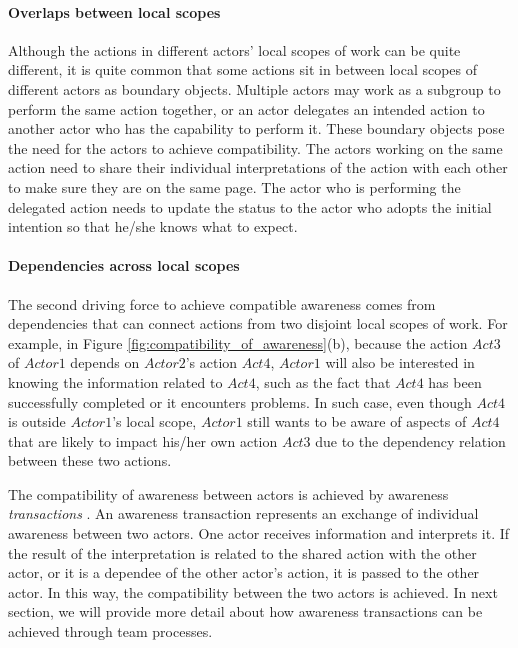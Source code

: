 \paragraph*{Overlaps between local scopes} %
\label{par:overlaps_between_local_scopes}
Although the actions in different actors' local scopes of work can be quite different, it is quite common that some actions sit in between local scopes of different actors as boundary objects. Multiple actors may work as a subgroup to perform the same action together, or an actor delegates an intended action to another actor who has the capability to perform it. These boundary objects pose the need for the actors to achieve compatibility. The actors working on the same action need to share their individual interpretations of the action with each other to make sure they are on the same page. The actor who is performing the delegated action needs to update the status to the actor who adopts the initial intention so that he/she knows what to expect. 

\paragraph*{Dependencies across local scopes} %
 \label{par:dependencies_across_local_scopes}
 The second driving force to achieve compatible awareness comes from dependencies that can connect actions from two disjoint local scopes of work. For example, in Figure \ref{fig:compatibility_of_awareness}(b), because the action $Act3$ of $Actor1$ depends on $Actor2$'s action $Act4$, $Actor1$ will also be interested in knowing the information related to $Act4$, such as the fact that $Act4$ has been successfully completed or it encounters problems. In such case, even though $Act4$ is outside $Actor1$'s local scope, $Actor1$ still wants to be aware of aspects of $Act4$ that are likely to impact his/her own action $Act3$ due to the dependency relation between these two actions.

The compatibility of awareness between actors is achieved by awareness \emph{transactions} \cite{Salmon2010}. An awareness transaction represents an exchange of individual awareness between two actors. One actor receives information and interprets it. If the result of the interpretation is related to the shared action with the other actor, or it is a dependee of the other actor's action, it is passed to the other actor. In this way, the compatibility between the two actors is achieved. In next section, we will provide more detail about how awareness transactions can be achieved through team processes. 

